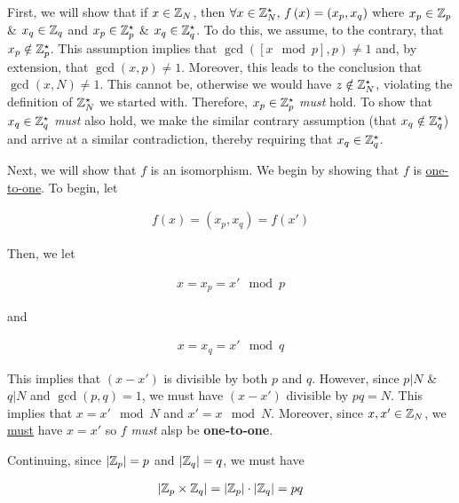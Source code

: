 \documentclass[../CryptoFinal.tex]{subfiles}
\begin{document}
\begin{flushleft}



  First, we will show that if $x \in \mathbb{Z}_N$, then $\forall x \in \mathbb{Z}_N^\star, \, f \left( x \right) = \left( x_p, x_q \right)$ where $x_p \in \mathbb{Z}_p$ \& $x_q \in \mathbb{Z}_q$ and $x_p \in \mathbb{Z}_p^\star$ \& $x_q \in \mathbb{Z}_q^\star$.  To do this, we assume, to the contrary, that $x_p \notin \mathbb{Z}_p^\star$.  This assumption implies that $\gcd \left( \left[ x \mod p \right], p \right) \neq 1$ and, by extension, that $\gcd \left( x, p \right) \neq 1$.  Moreover, this leads to the conclusion that $\gcd \left( x, N \right) \neq 1$.  This cannot be, otherwise we would have $z \notin \mathbb{Z}_N^\star$, violating the definition of $\mathbb{Z}_N^\star$ we started with.  Therefore, $x_p \in \mathbb{Z}_p^\star$ \emph{must} hold.  To show that $x_q \in \mathbb{Z}_q^\star$ \emph{must} also hold, we make the similar contrary assumption (that $x_q \notin \mathbb{Z}_q^\star$) and arrive at a similar contradiction, thereby requiring that $x_q \in \mathbb{Z}_q^\star$. \newline

Next, we will show that $f$ is an isomorphism.  We begin by showing that $f$ is \underline{one-to-one}.  To begin, let

\begin{align*}
  f \left( x \right) = \left( x_p, x_q \right) = f \left( x' \right)
\end{align*}

Then, we let

\begin{align*}
  x = x_p = x' \mod p
\end{align*}

and

\begin{align*}
  x = x_q = x' \mod q
\end{align*}

This implies that $\left( x - x' \right)$ is divisible by both $p$ and $q$.  However, since $p \vert N$ \& $q \vert N$ and $\gcd \left( p, q \right) = 1$, we must have $\left( x - x' \right)$ divisible by $p q = N$.  This implies that $x = x' \mod N$ and $x' = x \mod N$.  Moreover, since $x, x' \in \mathbb{Z}_N$, we \underline{must} have $x = x'$ so $f$ \emph{must} alsp be \textbf{one-to-one}. \newline

Continuing, since $\left| \mathbb{Z}_p \right| = p$ and $\left| \mathbb{Z}_q \right| = q$, we must have

\begin{align}
  \left| \mathbb{Z}_p \times \mathbb{Z}_q \right| = \left| \mathbb{Z}_p \right| \cdot \left| \mathbb{Z}_q \right| = p q \label{eq5a}
\end{align}


\end{flushleft}
\end{document}
